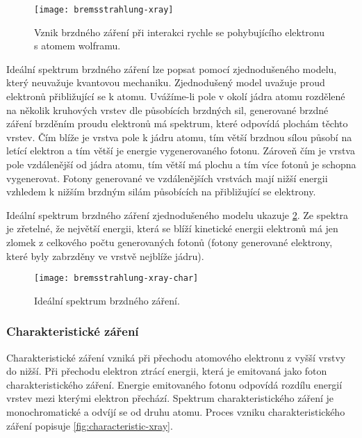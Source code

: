 \begin{figure}[bh]
\centering
\texttt{[image: bremsstrahlung-xray]}
\caption{Vznik brzdného záření při interakci rychle se pohybujícího elektronu s atomem wolframu. \cite{the-xray-beam}}
\label{fig:bremsstrahlung-xray}
\end{figure}

Ideální spektrum brzdného záření lze popsat pomocí zjednodušeného modelu, který neuvažuje kvantovou mechaniku. Zjednodušený model uvažuje proud elektronů přibližující se k atomu. Uvážíme-li pole v okolí jádra atomu rozdělené na několik kruhových vrstev dle působících brzdných sil, generované brzdné záření brzděním proudu elektronů má spektrum, které odpovídá plochám těchto vrstev. Čím blíže je vrstva pole k jádru atomu, tím větší brzdnou sílou působí na letící elektron a tím větší je energie vygenerovaného fotonu. Zároveň čím je vrstva pole vzdálenější od jádra atomu, tím větší má plochu a tím více fotonů je schopna vygenerovat. Fotony generované ve vzdálenějších vrstvách mají nižší energii vzhledem k nižším brzdným silám působících na přibližující se elektrony. \cite[kap.~THE~X-RAY TUBE]{The-Physical-Principles-of-Medical-Imaging}

Ideální spektrum brzdného záření zjednodušeného modelu ukazuje \cref{fig:bremsstrahlung-xray-char}. Ze spektra je zřetelné, že největší energii, která se blíží kinetické energii elektronů má jen zlomek z celkového počtu generovaných fotonů (fotony generované elektrony, které byly zabrzděny ve vrstvě nejblíže jádru).

\begin{figure}[bh]
\centering
\texttt{[image: bremsstrahlung-xray-char]}
\caption{Ideální spektrum brzdného záření. \cite[str.~90]{Diagnostic-Radiology-Physics}}
\label{fig:bremsstrahlung-xray-char}
\end{figure}

\subsubsection{Charakteristické záření}
Charakteristické záření vzniká při přechodu atomového elektronu z vyšší vrstvy do nižší. Při přechodu elektron ztrácí energii, která je emitovaná jako foton charakteristického záření. Energie emitovaného fotonu odpovídá rozdílu energií vrstev mezi kterými elektron přechází. Spektrum charakteristického záření je monochromatické a odvíjí se od druhu atomu. Proces vzniku charakteristického záření popisuje \cref{fig:characteristic-xray}. \cite[str.~91]{Diagnostic-Radiology-Physics}

